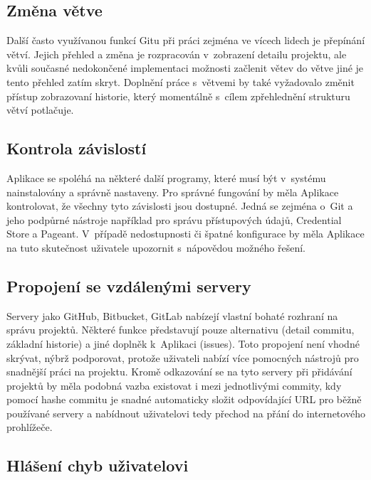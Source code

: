 \subsection{Změna větve}

Další často využívanou funkcí Gitu při práci zejména ve vícech lidech je přepínání větví. Jejich přehled a změna je rozpracován v~zobrazení detailu projektu, ale kvůli současné nedokončené implementaci možnosti začlenit větev do větve jiné je tento přehled zatím skryt. Doplnění práce s~větvemi by také vyžadovalo změnit přístup zobrazovaní historie, který momentálně s~cílem zpřehlednění strukturu větví potlačuje.

\subsection{Kontrola závislostí}

Aplikace se spoléhá na některé další programy, které musí být v~systému nainstalovány a správně nastaveny. Pro správné fungování by měla Aplikace kontrolovat, že všechny tyto závislosti jsou dostupné. Jedná se zejména o~Git a jeho podpůrné nástroje například pro správu přístupových údajů, Credential Store a Pageant. V~případě nedostupnosti či špatné konfigurace by měla Aplikace na tuto skutečnost uživatele upozornit s~nápovědou možného řešení.

\subsection{Propojení se vzdálenými servery}

Servery jako GitHub, Bitbucket, GitLab nabízejí vlastní bohaté rozhraní na správu projektů. Některé funkce představují pouze alternativu (detail commitu, základní historie) a jiné doplněk k~Aplikaci (issues). Toto propojení není vhodné skrývat, nýbrž podporovat, protože uživateli nabízí více pomocných nástrojů pro snadnější práci na projektu. Kromě odkazování se na tyto servery při přidávání projektů by měla podobná vazba existovat i mezi jednotlivými commity, kdy pomocí hashe commitu je snadné automaticky složit odpovídající URL pro běžně používané servery a nabídnout uživatelovi tedy přechod na přání do internetového prohlížeče.

\subsection{Hlášení chyb uživatelovi}


